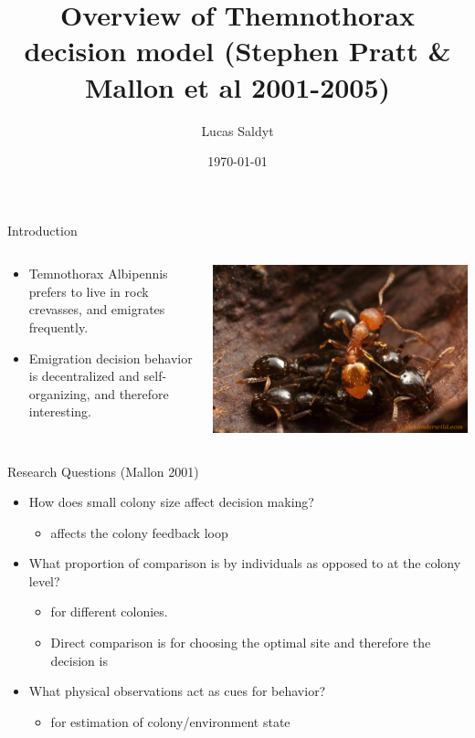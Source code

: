 \documentclass{beamer}
\title{Overview of Themnothorax decision model (Stephen Pratt \& Mallon et al 2001-2005)}
\date{\today}
\author{Lucas Saldyt}
\institute{Arizona State University}
\makeatletter
\def\mcolor#1#{\@mcolor{#1}}
\def\@mcolor#1#2#3{%
  \protect\leavevmode
  \begingroup
    \color#1{#2}#3%
  \endgroup
}
\newcommand{\sitem}[1]
{
    \begin{itemize}
        \item #1
    \end{itemize}
}
\makeatother
\begin{document}
  \maketitle
  \begin{frame}{Introduction}
      \begin{columns}
          \begin{column}{0.5\textwidth}
              \begin{itemize}
                  \item Temnothorax Albipennis prefers to live in rock crevasses, and emigrates frequently.
                  \item Emigration decision behavior is decentralized and self-organizing, and therefore interesting.
              \end{itemize}
          \end{column}
          \begin{column}{0.5\textwidth}
              \includegraphics[scale=1.0]{americanus}
          \end{column}
      \end{columns}
  \end{frame}

  \begin{frame}{Research Questions (Mallon 2001)}
      \begin{itemize}
          \item How does small colony size affect decision making?
              \sitem{ affects the colony feedback loop}
          \item What proportion of comparison is by individuals as opposed to at the colony level? 
          \sitem{ for different colonies.}
          \sitem{Direct comparison is  for choosing the optimal site and therefore the decision is \mcolor{red}{decentralized}}
          \item What physical observations act as cues for behavior? 
              \sitem{ for estimation of colony/environment state}
      \end{itemize}
  \end{frame}
\end{document}
